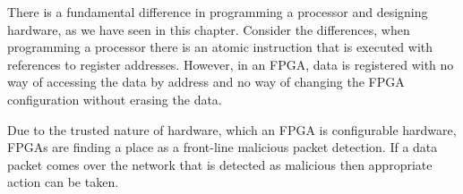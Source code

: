 There is a fundamental difference in programming a processor and designing hardware, as we have seen in this chapter. Consider the differences, when programming a processor there is an atomic instruction that is executed with references to register addresses. However, in an \ac{FPGA}, data is registered with no way of accessing the data by address and no way of changing the \ac{FPGA} configuration without erasing the data. 

Due to the trusted nature of hardware, which an \ac{FPGA} is configurable hardware, \ac{FPGA}s are finding a place as a front-line malicious packet detection. If a data packet comes over the network that is detected as malicious then appropriate action can be taken. 
